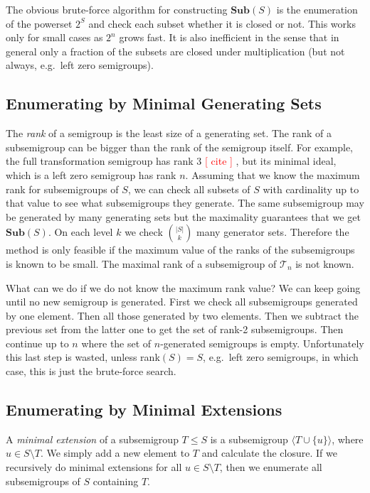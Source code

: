 \documentclass{amsart}
\newcommand{\cT}{{\mathcal T}}
\newcommand{\Sub}{\mathbf{Sub}}
\newcommand{\todo}[1]{\textcolor{red}{ \small \textsf{[ #1 ]} \normalsize}}
\theoremstyle{plain}
\theoremstyle{definition}
\begin{document}
The obvious brute-force algorithm for constructing $\Sub(S)$ is the enumeration of the powerset $2^S$ and check each subset whether it is closed or not.
This works only for small cases as $2^n$ grows fast.
It is also inefficient in the sense that in general only a fraction of the
subsets are closed under multiplication (but not always, e.g.\ left zero
semigroups).
 
\subsection{Enumerating by Minimal Generating Sets}
\label{sec:mingen}
The \emph{rank} of a semigroup is the least size of a  generating set.
The rank of a subsemigroup can be bigger than the rank of the semigroup itself.
For example, the full transformation semigroup has rank 3 \todo{cite}, but its minimal ideal, which is a left zero semigroup has rank $n$. 
Assuming that we know the maximum rank for subsemigroups of $S$, we can check all subsets of $S$ with cardinality up to that value to see what subsemigroups they generate.
The same subsemigroup may be generated by many generating sets but the maximality guarantees that we get $\Sub(S)$.
On each level $k$ we check $\binom{|S|}{k}$ many generator sets.
Therefore the method is only feasible if the maximum value of the ranks of the subsemigroups is known to be small.
The maximal rank of a subsemigroup of $\cT_n$ is not known. %

What can we do if we do not know the maximum rank value?
We can keep going until no new semigroup is generated.
First we check all subsemigroups generated by one element.
Then all those generated by two elements.
Then we subtract the previous set from the latter one to get the set of rank-2 subsemigroups.
Then continue up to $n$ where the set of $n$-generated semigroups is empty.
Unfortunately this last step is wasted, unless rank$(S)=S$, e.g.~left zero
semigroups, in which case, this is just the brute-force search.


\subsection{Enumerating by Minimal Extensions}
\label{sec:minext}

A \emph{minimal extension} of a subsemigroup $T\leq S$ is a subsemigroup $\langle T\cup\{u\}\rangle$, where $u\in S\setminus T$.
We simply add a new element to $T$ and calculate the closure.
If we recursively do minimal extensions for all $u\in S\setminus T$, then we enumerate all subsemigroups of $S$ containing $T$.
\end{document}
